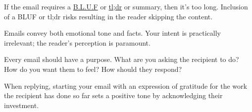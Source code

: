 If the email requires a \href{https://en.wikipedia.org/wiki/BLUF_(communication)}{B.L.U.F} or \href{https://en.wikipedia.org/wiki/Wikipedia:Too_long;_didn\%27t_read}{tl;dr} or summary, then it's too long. Inclusion of a BLUF or tl;dr risks resulting in the reader skipping the content. 

Emails convey both emotional tone and facts. Your intent is practically irrelevant; the reader's perception is paramount. 

Every email should have a purpose. What are you asking the recipient to do? How do you want them to feel? How should they respond?

When replying, starting your email with an expression of gratitude for the work the recipient has done so far sets a positive tone by acknowledging their investment.

